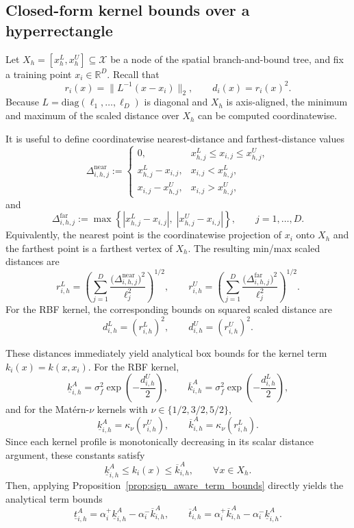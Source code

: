 \documentclass[pdflatex,sn-mathphys-num]{sn-jnl}%
\theoremstyle{thmstyleone}%
\theoremstyle{thmstyletwo}%
\theoremstyle{thmstylethree}%
\begin{document}
\subsection{Closed-form kernel bounds over a hyperrectangle}
\label{app:analytic_bounds}

Let $X_h=[x_h^L,x_h^U]\subseteq\mathcal{X}$ be a node of the spatial branch-and-bound tree, and fix a training point $x_i\in\mathbb{R}^D$. Recall that
\[
r_i(x)=\|L^{-1}(x-x_i)\|_2,
\qquad
d_i(x)=r_i(x)^2.
\]
Because $L=\mathrm{diag}(\ell_1,\ldots,\ell_D)$ is diagonal and $X_h$ is axis-aligned, the minimum and maximum of the scaled distance over $X_h$ can be computed coordinatewise.

It is useful to define coordinatewise nearest-distance and farthest-distance values
\[
\Delta^{\mathrm{near}}_{i,h,j}
:=
\begin{cases}
0, & x_{h,j}^L \le x_{i,j} \le x_{h,j}^U,\\
x_{h,j}^L - x_{i,j}, & x_{i,j} < x_{h,j}^L,\\
x_{i,j} - x_{h,j}^U, & x_{i,j} > x_{h,j}^U,
\end{cases}
\]
and
\[
\Delta^{\mathrm{far}}_{i,h,j}
:=
\max\!\left\{|x_{h,j}^L-x_{i,j}|,\;|x_{h,j}^U-x_{i,j}|\right\},
\qquad j=1,\ldots,D.
\]
Equivalently, the nearest point is the coordinatewise projection of $x_i$ onto $X_h$ and the farthest point is a farthest vertex of $X_h$.
The resulting min/max scaled distances are
\begin{equation}
r_{i,h}^L
=
\left(
\sum_{j=1}^D \frac{\big(\Delta^{\mathrm{near}}_{i,h,j}\big)^2}{\ell_j^2}
\right)^{1/2},
\qquad
r_{i,h}^U
=
\left(
\sum_{j=1}^D \frac{\big(\Delta^{\mathrm{far}}_{i,h,j}\big)^2}{\ell_j^2}
\right)^{1/2}.
\label{eq:app_r_bounds}
\end{equation}
For the RBF kernel, the corresponding bounds on squared scaled distance are
\[
d_{i,h}^L=(r_{i,h}^L)^2,
\qquad
d_{i,h}^U=(r_{i,h}^U)^2.
\]

These distances immediately yield analytical box bounds for the kernel term $k_i(x)=k(x,x_i)$. For the RBF kernel,
\[
\underline{k}_{i,h}^{A}
=
\sigma_f^2 \exp\!\left(-\frac{d_{i,h}^U}{2}\right),
\qquad
\overline{k}_{i,h}^{A}
=
\sigma_f^2 \exp\!\left(-\frac{d_{i,h}^L}{2}\right),
\]
and for the Mat\'ern-$\nu$ kernels with $\nu\in\{1/2,3/2,5/2\}$,
\[
\underline{k}_{i,h}^{A}
=
\kappa_\nu(r_{i,h}^U),
\qquad
\overline{k}_{i,h}^{A}
=
\kappa_\nu(r_{i,h}^L).
\]
Since each kernel profile is monotonically decreasing in its scalar distance argument, these constants satisfy
\[
\underline{k}_{i,h}^{A}\le k_i(x)\le \overline{k}_{i,h}^{A},
\qquad \forall x\in X_h.
\]
Then, applying Proposition~\ref{prop:sign_aware_term_bounds} directly yields the analytical term bounds
\[
\underline{t}_{i,h}^{A}
=
\alpha_i^+ \underline{k}_{i,h}^{A}
-
\alpha_i^- \overline{k}_{i,h}^{A},
\qquad
\overline{t}_{i,h}^{A}
=
\alpha_i^+ \overline{k}_{i,h}^{A}
-
\alpha_i^- \underline{k}_{i,h}^{A}.
\]
\end{document}
